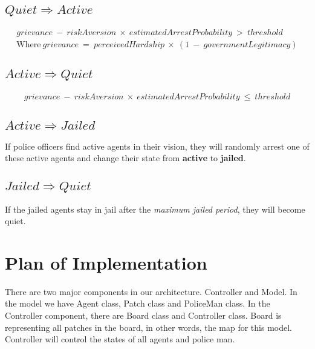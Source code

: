 \documentclass[UTF8,11pt]{article}
\begin{document}
        \subsection{$Quiet \Rightarrow Active$}
        \begin{equation}
            \begin{split}
                grievance\:-\:riskAversion\:\times\:estimatedArrestProbability\:>\:threshold \\
                \text{Where}\ grievance\:=\:perceivedHardship\:\times\:(1\:-\:governmentLegitimacy)
            \end{split}
        \end{equation}
        \subsection{$Active \Rightarrow Quiet$}
        \begin{equation}
            \begin{split}
                grievance\:-\:riskAversion\:\times\:estimatedArrestProbability\:\leq\:threshold
            \end{split}
        \end{equation}
        \subsection{$Active \Rightarrow Jailed$}
            If police officers find active agents in their vision, they will
            randomly arrest one of these active agents and change their state 
            from \textbf{active} to \textbf{jailed}.
        \subsection{$Jailed \Rightarrow Quiet$}
            If the jailed agents stay in jail after the \textit{maximum jailed 
            period}, they will become quiet.

    \section{Plan of Implementation}
        There are two major components in our architecture. Controller and Model.
        In the model we have Agent class, Patch class and PoliceMan class. In the
        Controller component, there are Board class and Controller class. Board
        is representing all patches in the board, in other words, the map for this
        model. Controller will control the states of all agents and police man.
\end{document}
